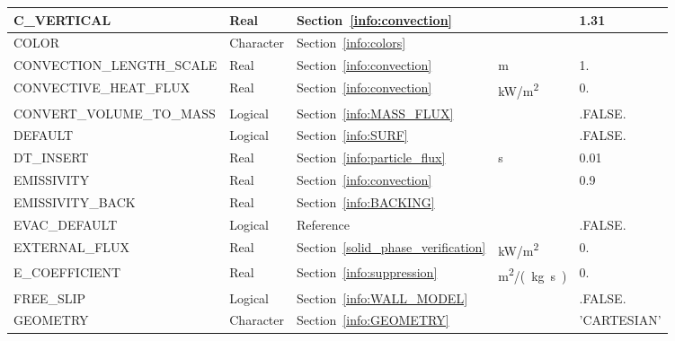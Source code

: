 \documentclass[11pt]{book}
\begin{document}
\begin{longtable}{@{\extracolsep{\fill}}|l|l|l|l|l|}
{\ct C\_VERTICAL}                     & Real            & Section~\ref{info:convection}             &                     & 1.31                    \\ \hline
{\ct COLOR    }                       & Character       & Section~\ref{info:colors}                 &                     &                         \\ \hline
{\ct CONVECTION\_LENGTH\_SCALE}       & Real            & Section~\ref{info:convection}             & m                   & 1.                      \\ \hline
{\ct CONVECTIVE\_HEAT\_FLUX}          & Real            & Section~\ref{info:convection}             & \si{kW/m^2}         & 0.                      \\ \hline
{\ct CONVERT\_VOLUME\_TO\_MASS}       & Logical         & Section~\ref{info:MASS_FLUX}              &                     & {\ct .FALSE.}           \\ \hline
{\ct DEFAULT}                         & Logical         & Section~\ref{info:SURF}                   &                     & {\ct .FALSE.}           \\ \hline
{\ct DT\_INSERT}                      & Real            & Section~\ref{info:particle_flux}          & s                   & 0.01                    \\ \hline
{\ct EMISSIVITY}                      & Real            & Section~\ref{info:convection}             &                     & 0.9                     \\ \hline
{\ct EMISSIVITY\_BACK}                & Real            & Section~\ref{info:BACKING}                &                     &                         \\ \hline
{\ct EVAC\_DEFAULT}                   & Logical         & Reference~\cite{FDS_Evac_Users_Guide}     &                     & {\ct .FALSE.}           \\ \hline
{\ct EXTERNAL\_FLUX}                  & Real            & Section~\ref{solid_phase_verification}    & \si{kW/m^2}         & 0.                      \\ \hline
{\ct E\_COEFFICIENT}                  & Real            & Section~\ref{info:suppression}            & \si{m^2/(kg.s)}     & 0.                      \\ \hline
{\ct FREE\_SLIP}                      & Logical         & Section~\ref{info:WALL_MODEL}             &                     & {\ct .FALSE.}           \\ \hline
{\ct GEOMETRY}                        & Character       & Section~\ref{info:GEOMETRY}               &                     & {\ct 'CARTESIAN'}       \\ \hline

\end{longtable}
\end{document}
